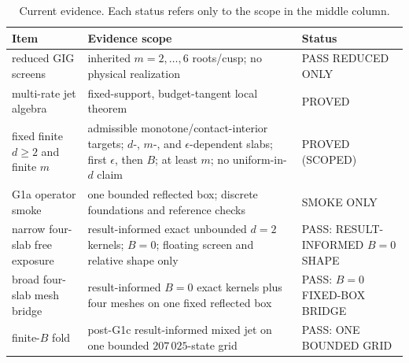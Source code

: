 \documentclass[aps,physrev,reprint,amsmath,amssymb,longbibliography,floatfix]{revtex4-2}
\begin{document}
\begin{table}[t]
\caption{\label{tab:gates}
Current evidence.  Each status refers only to the scope in the middle column.}
\small
\begin{tabular}{p{}p{}p{}}
\toprule
Item & Evidence scope & Status\\
\midrule
{\raggedright reduced GIG screens\par} & {\raggedright inherited $m=2,\ldots,6$ roots/cusp; no physical realization\par} & {\raggedright PASS REDUCED ONLY\par}\tabularnewline
{\raggedright multi-rate jet algebra\par} & {\raggedright fixed-support, budget-tangent local theorem\par} & {\raggedright PROVED\par}\tabularnewline
{\raggedright fixed finite $d\ge2$ and finite $m$\par} & {\raggedright admissible monotone/contact-interior targets; $d$-, $m$-, and $\epsilon$-dependent slabs; first $\epsilon$, then $B$; at least $m$; no uniform-in-$d$ claim\par} & {\raggedright PROVED (SCOPED)\par}\tabularnewline
{\raggedright G1a operator smoke\par} & {\raggedright one bounded reflected box; discrete foundations and reference checks\par} & {\raggedright SMOKE ONLY\par}\tabularnewline
{\raggedright narrow four-slab free exposure\par} & {\raggedright result-informed exact unbounded $d=2$ kernels; $B=0$; floating screen and relative shape only\par} & {\raggedright PASS: RESULT-INFORMED $B=0$ SHAPE\par}\tabularnewline
{\raggedright broad four-slab mesh bridge\par} & {\raggedright result-informed $B=0$ exact kernels plus four meshes on one fixed reflected box\par} & {\raggedright PASS: $B=0$ FIXED-BOX BRIDGE\par}\tabularnewline
{\raggedright finite-$B$ fold\par} & {\raggedright post-G1c result-informed mixed jet on one bounded $207\,025$-state grid\par} & {\raggedright PASS: ONE BOUNDED GRID\par}\tabularnewline

\end{tabular}
\end{table}
\end{document}
